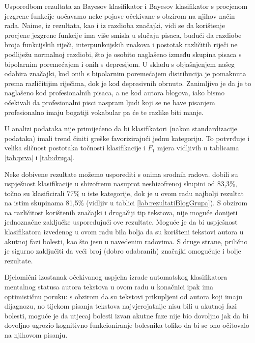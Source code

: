\documentclass[10pt, a4paper]{article}
\begin{document}
Usporedbom rezultata za Bayesov klasifikator i Bayesov klasifikator s procjenom jezgrene funkcije uočavamo neke pojave očekivane s obzirom na njihov način rada. Naime, iz rezultata, kao i iz razdioba značajki, vidi se da korištenje procjene jezgrene funkcije ima više smisla u slučaju pisaca, budući da razdiobe broja funkcijskih riječi, interpunkcijskih znakova i postotak različitih riječi ne podliježu normalnoj razdiobi, što je osobito naglašeno između skupina pisaca s bipolarnim poremećajem i onih s depresijom. U skladu s objašnjenjem našeg odabira značajki, kod onih s bipolarnim poremećajem distribucija je pomaknuta prema različitijim riječima, dok je kod depresivnih obrnuto. Zanimljivo je da je to naglašeno kod profesionalnih pisaca, a ne kod autora blogova, iako bismo očekivali da profesionalni pisci naspram ljudi koji se ne bave pisanjem profesionalno imaju bogatiji vokabular pa će te razlike biti manje.

U analizi podataka nije primijećeno da bi klasifikatori (nakon standardizacije podataka) imali trend činiti greške favorizirajući jednu kategoriju. To potvrđuje i velika sličnost postotaka točnosti klasifikacije i  $F_1$ mjera vidljivih u tablicama \ref{tab:prva} i \ref{tab:druga}.

Neke dobivene rezultate možemo usporediti s onima srodnih radova.  \citet{strous-2009} dobili su uspješnost klasifikacije u shizofrenu nasuprot neshizofrenoj skupini od 83,3\%, \citet{exray} točno su klasificirali 77\% u iste kategorije, dok je u ovom radu najbolji rezultat na istim skupinama 81,5\% (vidljiv u tablici \ref{lab:rezultatiBlogGrupa}). S obzirom na različitost korištenih značajki i drugačiji tip tekstova, nije moguće donijeti jednoznačne zaključke uspoređujući ove rezultate. Moguće je da bi uspješnost klasifikatora izvedenog u ovom radu bila bolja da su korišteni tekstovi autora u akutnoj fazi bolesti, kao što jesu u navedenim radovima. S druge strane, prilično je sigurno zaključiti da veći broj (dobro odabranih) značajki omogućuje i bolje rezultate.

Djelomični izostanak očekivanog uspjeha izrade automatskog klasifikatora mentalnog statusa autora tekstova u ovom radu u konačnici ipak ima optimističnu poruku: s obzirom da su tekstovi prikupljeni  od autora koji imaju dijagnozu, no tijekom pisanja tekstova najvjerojatnije nisu bili u akutnoj fazi bolesti, moguće je da utjecaj bolesti izvan akutne faze nije bio dovoljno jak da bi dovoljno ugrozio kognitivno funkcioniranje bolesnika toliko da bi se ono očitovalo na njihovom pisanju. 
\end{document}

